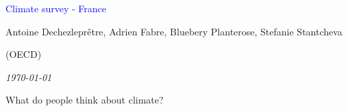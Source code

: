 



%
              





\begin{frame}
\thispagestyle{empty}
\begin{center}
\begin{LARGE}
\textcolor{blue}{Climate survey - France}
\end{LARGE}

\vspace{1cm}


Antoine Dechezleprêtre, Adrien Fabre, Bluebery Planterose, Stefanie Stantcheva 

\vspace{-0.3cm}
(OECD)

\textit{\today} 

\end{center}

\bigskip


\end{frame}


\begin{frame}{What do people think about climate?}
\end{frame}

